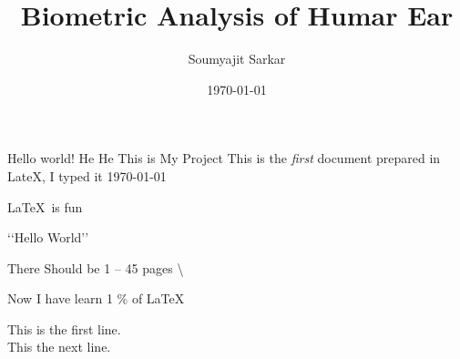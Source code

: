 \documentclass{article}
\title{Biometric Analysis of Humar Ear}
\author{Soumyajit Sarkar}
\date{\today}
\begin{document}
   \maketitle
   Hello world! He He This is My Project
   This is the \emph{first} document prepared in LateX, I typed it \today
   
   \LaTeX \ is fun
   
   \lq\lq Hello World\rq\rq
   
   There Should be 1 -- 45 pages \textbackslash
   
   Now  I have learn 1 \% of \LaTeX
   
   This is the first line. \\ [10pt]
     \@ \@ \@  This the next line.
\end{document}
